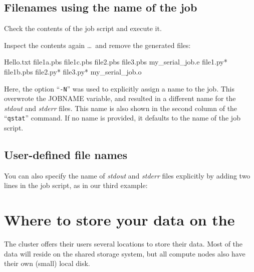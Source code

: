 \subsection{Filenames using the name of the job}

Check the contents of the job script and execute it.


\begin{prompt}
\end{prompt}

Inspect the contents again \dots\ and remove the generated files:

\begin{prompt}
Hello.txt  file1a.pbs  file1c.pbs  file2.pbs  file3.pbs  my_serial_job.e%
file1.py*  file1b.pbs  file2.py*   file3.py*  my_serial_job.o%
\end{prompt}

Here, the option ``\texttt{-N}'' was used to explicitly assign a name to the job.  This
overwrote the JOBNAME variable, and resulted in a different name for the
\emph{stdout} and \emph{stderr} files. This name is also shown in the
second column of the ``\texttt{qstat}'' command. If no name is provided, it defaults to
the name of the job script.

\subsection{User-defined file names}

You can also specify the name of \emph{stdout} and \emph{stderr} files
explicitly by adding two lines in the job script, as in our third example:


\begin{prompt}
\end{prompt}

\section{Where to store your data on the \hpc}
\hypertarget{where-to-store-data}{}

The \hpc cluster offers their users several locations to store their data. Most
of the data will reside on the shared storage system, but all compute nodes
also have their own (small) local disk.

